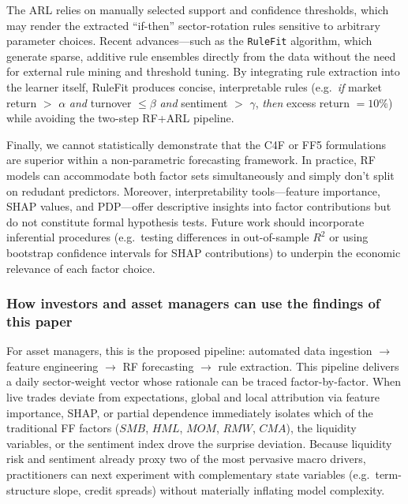 The ARL relies on manually selected support and confidence thresholds, which may render the extracted “if-then” sector-rotation rules sensitive to arbitrary parameter choices. Recent advances—such as the \texttt{RuleFit} algorithm, which generate sparse, additive rule ensembles directly from the data without the need for external rule mining and threshold tuning. By integrating rule extraction into the learner itself, RuleFit produces concise, interpretable rules (e.g.\ \emph{if} market return $>$ $\alpha$ \emph{and} turnover $\le \beta$ \emph{and} sentiment $>$ $\gamma$, \emph{then} excess return $=10\%$) while avoiding the two-step RF+ARL pipeline.

Finally, we cannot statistically demonstrate that the C4F or FF5 formulations are superior within a non-parametric forecasting framework. In practice, RF models can accommodate both factor sets simultaneously and simply don't split on redudant predictors. Moreover, interpretability tools—feature importance, SHAP values, and PDP—offer descriptive insights into factor contributions but do not constitute formal hypothesis tests. Future work should incorporate inferential procedures (e.g.\ testing differences in out-of-sample $R^2$ or using bootstrap confidence intervals for SHAP contributions) to underpin the economic relevance of each factor choice.

\subsubsection{How investors and asset managers can use the findings of this paper}
For asset managers, this is the proposed pipeline: automated data ingestion $\rightarrow$ feature engineering $\rightarrow$ RF forecasting $\rightarrow$ rule extraction. This pipeline delivers a daily sector-weight vector whose rationale can be traced factor-by-factor. When live trades deviate from expectations, global and local attribution via feature importance, SHAP, or partial dependence immediately isolates which of the traditional FF factors ($SMB$, $HML$, $MOM$, $RMW$, $CMA$), the liquidity variables, or the sentiment index drove the surprise deviation. Because liquidity risk and sentiment already proxy two of the most pervasive macro drivers, practitioners can next experiment with complementary state variables (e.g.\ term-structure slope, credit spreads) without materially inflating model complexity.


